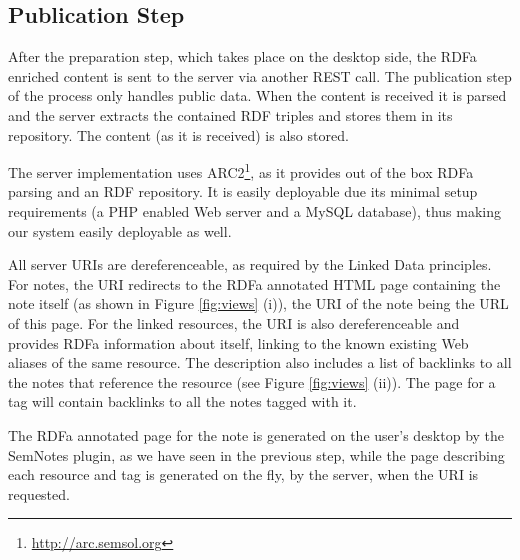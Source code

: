 \subsection{Publication Step}

After the preparation step, which takes place on the desktop side, the RDFa enriched content is sent to the server via another REST call. The publication step of the process only handles public data. When the content is received it is parsed and the server extracts the contained RDF triples and stores them in its repository. The content (as it is received) is also stored.

The server implementation uses ARC2\footnote{\url{http://arc.semsol.org}}, as it provides out of the box RDFa parsing and an RDF repository. It is easily deployable due its minimal setup requirements (a PHP enabled Web server and a MySQL database), thus making our system easily deployable as well.

All server URIs are dereferenceable, as required by the Linked Data principles. For notes, the URI redirects to the RDFa annotated HTML page containing the note itself (as shown in Figure \ref{fig:views} (i)), the URI of the note being the URL of this page. For the linked resources, the URI is also dereferenceable and provides RDFa information about itself, linking to the known existing Web aliases of the same resource. The description also includes a list of backlinks to all the notes that reference the resource (see Figure \ref{fig:views} (ii)). The page for a tag will contain backlinks to all the notes tagged with it.

The RDFa annotated page for the note is generated on the user's desktop by the SemNotes plugin, as we have seen in the previous step, while the page describing each resource and tag is generated on the fly, by the server, when the URI is requested.

